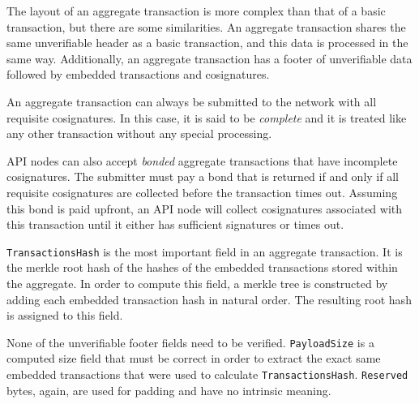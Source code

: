 The layout of an aggregate transaction is more complex than that of a basic transaction, but there are some similarities.
An aggregate transaction shares the same unverifiable header as a basic transaction, and this data is processed in the same way.
Additionally, an aggregate transaction has a footer of unverifiable data followed by embedded transactions and cosignatures.

An aggregate transaction can always be submitted to the network with all requisite cosignatures.
In this case, it is said to be \emph{complete} and it is treated like any other transaction without any special processing.

API nodes can also accept \emph{bonded} aggregate transactions that have incomplete cosignatures.
The submitter must pay a bond that is returned if and only if all requisite cosignatures are collected before the transaction times out.
Assuming this bond is paid upfront, an API node will collect cosignatures associated with this transaction until it either has sufficient signatures or times out.

\texttt{TransactionsHash} is the most important field in an aggregate transaction.
It is the merkle root hash of the hashes of the embedded transactions stored within the aggregate.
In order to compute this field, a merkle tree is constructed by adding each embedded transaction hash in natural order.
The resulting root hash is assigned to this field.

None of the unverifiable footer fields need to be verified.
\texttt{PayloadSize} is a computed size field that must be correct in order to extract the exact same embedded transactions that were used to calculate \texttt{TransactionsHash}.
\texttt{Reserved} bytes, again, are used for padding and have no intrinsic meaning.

